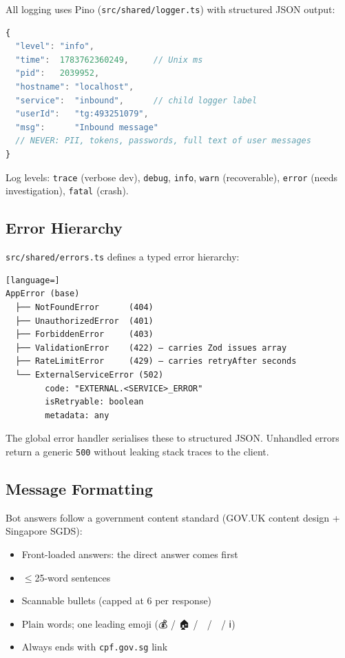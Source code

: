 \documentclass[12pt,a4paper]{article}
\begin{document}
All logging uses Pino (\texttt{src/shared/logger.ts}) with structured JSON output:
\begin{lstlisting}[language=JavaScript]
{
  "level": "info",
  "time":  1783762360249,     // Unix ms
  "pid":   2039952,
  "hostname": "localhost",
  "service":  "inbound",      // child logger label
  "userId":   "tg:493251079",
  "msg":      "Inbound message"
  // NEVER: PII, tokens, passwords, full text of user messages
}
\end{lstlisting}

Log levels: \texttt{trace} (verbose dev), \texttt{debug}, \texttt{info},
\texttt{warn} (recoverable), \texttt{error} (needs investigation), \texttt{fatal} (crash).

\subsection{Error Hierarchy}

\texttt{src/shared/errors.ts} defines a typed error hierarchy:
\begin{lstlisting}[language=]
AppError (base)
  ├── NotFoundError      (404)
  ├── UnauthorizedError  (401)
  ├── ForbiddenError     (403)
  ├── ValidationError    (422) — carries Zod issues array
  ├── RateLimitError     (429) — carries retryAfter seconds
  └── ExternalServiceError (502)
        code: "EXTERNAL.<SERVICE>_ERROR"
        isRetryable: boolean
        metadata: any
\end{lstlisting}

The global error handler serialises these to structured JSON. Unhandled errors
return a generic \texttt{500} without leaking stack traces to the client.

\subsection{Message Formatting}

Bot answers follow a government content standard (GOV.UK content design + Singapore SGDS):
\begin{itemize}[noitemsep]
  \item Front-loaded answers: the direct answer comes first
  \item $\leq$25-word sentences
  \item Scannable bullets (capped at 6 per response)
  \item Plain words; one leading emoji (💰 / 🏠 / 🏥 / 📅 / ℹ️)
  \item Always ends with \texttt{cpf.gov.sg} link
\end{itemize}
\end{document}
